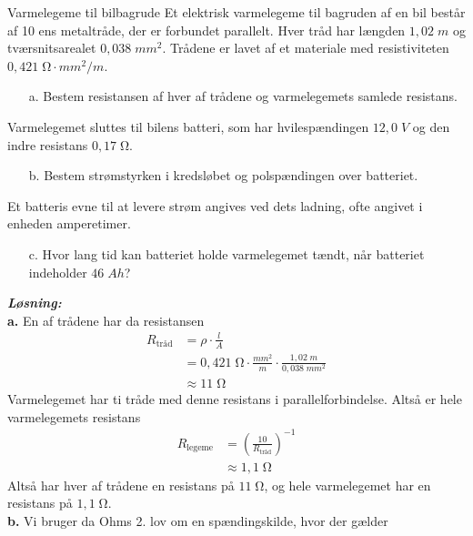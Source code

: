 \documentclass{report}
\newcommand{\sol}{\setlength{\parindent}{0cm}\textbf{\textit{Løsning:}}\setlength{\parindent}{1cm}}
\begin{document}
\begin{question}{Varmelegeme til bilbagrude}{}
  Et elektrisk varmelegeme til bagruden af en bil består af 10 ens metaltråde, der er forbundet parallelt. 
  Hver tråd har længden $1,02 \;\unit{m} $ og tværsnitsarealet $0,038 \;\unit{mm^2}$.
Trådene er lavet af et materiale med resistiviteten $0,421 \;\unit{\ohm \cdot mm^2/m}$.
\begin{itemize}
  \item[a.] Bestem resistansen af hver af trådene og varmelegemets samlede resistans.
\end{itemize}
Varmelegemet sluttes til bilens batteri, som har hvilespændingen $12,0 \;\unit{V}$ og den indre resistans $0,17 \;\unit{\ohm} $.
\begin{itemize}
  \item[b.] Bestem strømstyrken i kredsløbet og polspændingen over batteriet.
\end{itemize}
Et batteris evne til at levere strøm angives ved dets ladning, ofte angivet i enheden amperetimer.
\begin{itemize}
  \item[c.] Hvor lang tid kan batteriet holde varmelegemet tændt, når batteriet indeholder $46 \;\unit{Ah}$?
\end{itemize}
\end{question}
\sol \\
\textbf{a.}
En af trådene har da resistansen
\begin{equation*}
\begin{split}
  R_{\text{tråd} }&=\rho \cdot \frac{l}{A}\\
  &=0,421 \;\unit{\ohm \cdot \frac{mm^2}{m}} \cdot \frac{1,02 \;\unit{m} }{0,038 \;\unit{mm^2} }\\ 
  &\approx 11 \;\unit{\ohm} 
\end{split}
\end{equation*}
Varmelegemet har ti tråde med denne resistans i parallelforbindelse.
Altså er hele varmelegemets resistans
\begin{equation*}
\begin{split}
  R_{\text{legeme} }&=\left(\frac{10}{R_{\text{tråd} }}\right)^{-1}\\
  &\approx 1,1 \;\unit{\ohm} 
\end{split}
\end{equation*}
Altså har hver af trådene en resistans på $11 \;\unit{\ohm} $, og hele varmelegemet har en resistans på $1,1 \;\unit{\ohm} $. \\[1ex]
\textbf{b.}
Vi bruger da Ohms 2. lov om en spændingskilde, hvor der gælder
\end{document}
